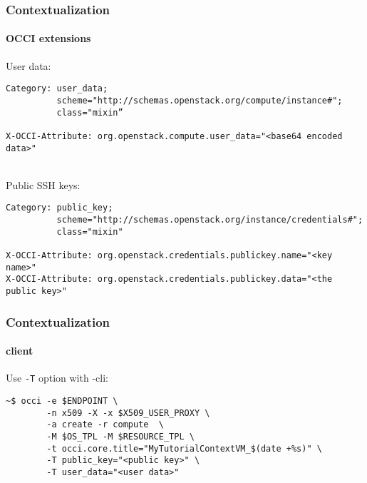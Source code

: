 
\begin{frame}[fragile]
  \frametitle{Contextualization}
  \framesubtitle{OCCI extensions}

  User data:
  \begin{Sbox}
  \Fonttiny
  \begin{minipage}{\linewidth-2\fboxsep-2\fboxrule-4pt}
  \color{white}
  \begin{verbatim}
Category: user_data;
          scheme="http://schemas.openstack.org/compute/instance#";
          class="mixin”

X-OCCI-Attribute: org.openstack.compute.user_data="<base64 encoded data>"
  \end{verbatim}
  \end{minipage}
  \end{Sbox}

  \hfill\\

  Public SSH keys:
  \begin{Sbox}
  \Fonttiny
  \begin{minipage}{\linewidth-2\fboxsep-2\fboxrule-4pt}
  \color{white}
  \begin{verbatim}
Category: public_key;
          scheme="http://schemas.openstack.org/instance/credentials#";
          class="mixin"

X-OCCI-Attribute: org.openstack.credentials.publickey.name="<key name>"
X-OCCI-Attribute: org.openstack.credentials.publickey.data="<the public key>"
  \end{verbatim}
  \end{minipage}
  \end{Sbox}

\end{frame}


\begin{frame}[fragile]
  \frametitle{Contextualization}
  \framesubtitle{\rocci client}

  Use \texttt{-T} option with \rocci-cli:

  \begin{Sbox}
  \Fontsmaller
  \begin{minipage}{\linewidth-2\fboxsep-2\fboxrule-4pt}
  \color{white}
  \begin{verbatim}
~$ occi -e $ENDPOINT \
        -n x509 -X -x $X509_USER_PROXY \
        -a create -r compute  \
        -M $OS_TPL -M $RESOURCE_TPL \
        -t occi.core.title="MyTutorialContextVM_$(date +%s)" \
        -T public_key="<public key>" \
        -T user_data="<user data>"
  \end{verbatim}
  \end{minipage}
  \end{Sbox}
  \fcolorbox{black}{black}{\TheSbox}
\end{frame}

